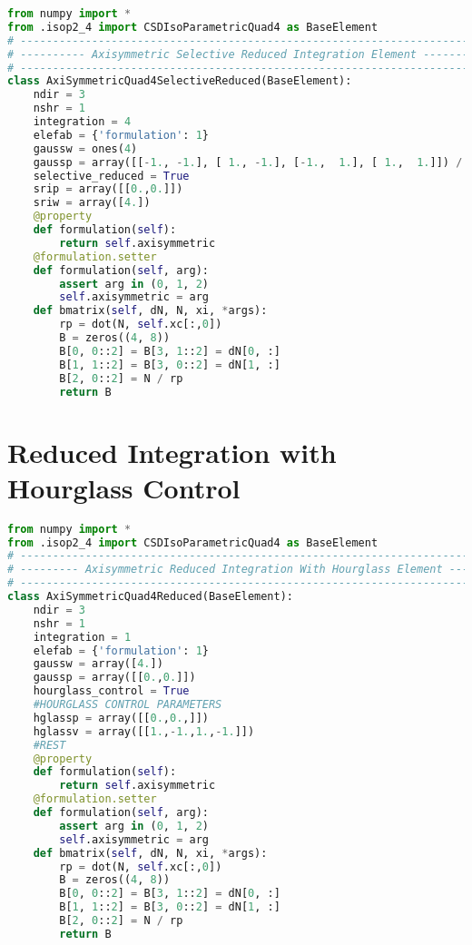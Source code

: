 \documentclass[10pt,letterpaper]{report}
\numberwithin{equation}{chapter}
\begin{document}
\begin{lstlisting}[language=Python]
from numpy import *
from .isop2_4 import CSDIsoParametricQuad4 as BaseElement
# --------------------------------------------------------------------------- #
# ---------- Axisymmetric Selective Reduced Integration Element ------------- #
# --------------------------------------------------------------------------- #
class AxiSymmetricQuad4SelectiveReduced(BaseElement):
    ndir = 3
    nshr = 1
    integration = 4
    elefab = {'formulation': 1}
    gaussw = ones(4)
    gaussp = array([[-1., -1.], [ 1., -1.], [-1.,  1.], [ 1.,  1.]]) / sqrt(3.)
    selective_reduced = True
    srip = array([[0.,0.]])
    sriw = array([4.])
    @property
    def formulation(self):
        return self.axisymmetric
    @formulation.setter
    def formulation(self, arg):
        assert arg in (0, 1, 2)
        self.axisymmetric = arg
    def bmatrix(self, dN, N, xi, *args):
        rp = dot(N, self.xc[:,0])
        B = zeros((4, 8))
        B[0, 0::2] = B[3, 1::2] = dN[0, :]
        B[1, 1::2] = B[3, 0::2] = dN[1, :]
        B[2, 0::2] = N / rp
        return B
\end{lstlisting}


\section{Reduced Integration with Hourglass Control}

\begin{lstlisting}[language=Python]
from numpy import *
from .isop2_4 import CSDIsoParametricQuad4 as BaseElement
# --------------------------------------------------------------------------- #
# --------- Axisymmetric Reduced Integration With Hourglass Element --------- #
# --------------------------------------------------------------------------- #
class AxiSymmetricQuad4Reduced(BaseElement):
    ndir = 3
    nshr = 1
    integration = 1
    elefab = {'formulation': 1}
    gaussw = array([4.])
    gaussp = array([[0.,0.]])
    hourglass_control = True
    #HOURGLASS CONTROL PARAMETERS
    hglassp = array([[0.,0.,]])
    hglassv = array([[1.,-1.,1.,-1.]])
    #REST
    @property
    def formulation(self):
        return self.axisymmetric
    @formulation.setter
    def formulation(self, arg):
        assert arg in (0, 1, 2)
        self.axisymmetric = arg
    def bmatrix(self, dN, N, xi, *args):
        rp = dot(N, self.xc[:,0])
        B = zeros((4, 8))
        B[0, 0::2] = B[3, 1::2] = dN[0, :]
        B[1, 1::2] = B[3, 0::2] = dN[1, :]
        B[2, 0::2] = N / rp
        return B
\end{lstlisting}
\end{document}
